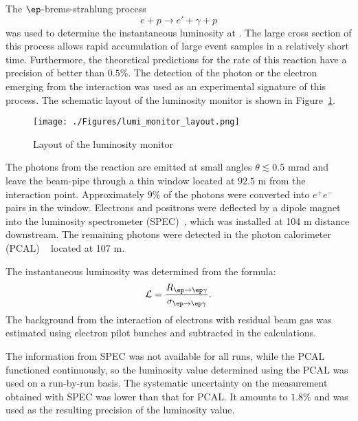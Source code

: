 The $\ep$-brems-strahlung process~\cite{Bethe:1934za}
\begin{equation}
	e + p \rightarrow e' + \gamma + p
\end{equation}
was used to determine the instantaneous luminosity at \zeus. The large cross section of this process allows rapid accumulation of large event samples in a relatively short time. Furthermore, the theoretical predictions for the rate of this reaction have a precision of better than $0.5\%$. The detection of the photon or the electron emerging from the interaction was used as an experimental signature of this process. The schematic layout of the luminosity monitor is shown in Figure~\ref{fig:lumi_monitor_layout}.
\begin{figure}
	\centering
		\texttt{[image: ./Figures/lumi\_monitor\_layout.png]}
	\caption{Layout of the \zeus luminosity monitor}
	\label{fig:lumi_monitor_layout}
\end{figure}
The photons from the reaction are emitted at small angles $\theta \lesssim 0.5$ mrad and leave the beam-pipe through a thin window located at $92.5$ m from the interaction point. Approximately $9\%$ of the photons were converted into $e^+e^-$ pairs in the window. Electrons and positrons were deflected by a dipole magnet into the luminosity spectrometer (SPEC)~\cite{physics-0512153}, which was installed at 104 m distance downstream. The remaining photons were detected in the photon calorimeter (PCAL) ~\cite{desy-92-066,zfp:c63:391,acpp:b32:2025} located at 107 m.

The instantaneous luminosity was determined from the formula:
\begin{equation}
\mathcal{L} = \frac{R_{\ep\rightarrow \ep\gamma}}{ \sigma_{\ep\rightarrow \ep\gamma}}.
\end{equation}
The background from the interaction of electrons with residual beam gas was estimated using electron pilot bunches and subtracted in the calculations.

The information from SPEC was not available for all runs, while the PCAL functioned continuously, so the luminosity value determined using the PCAL was used on a run-by-run basis. The systematic uncertainty on the measurement obtained with SPEC was lower than that for PCAL. It amounts to $1.8\%$ and was used as the resulting precision of the luminosity value.

